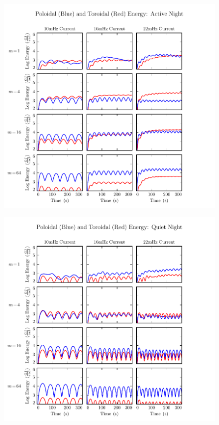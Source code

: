 \begin{figure}[H]
    \centering
    \includegraphics[width=\textwidth]{figures/UP_UT_J_3.pdf}
    \caption[Current-Driven Poloidal and Toroidal Energy: Active Night]{}
    \label{fig_UP_UT_J_3}
\end{figure}

\begin{figure}[H]
    \centering
    \includegraphics[width=\textwidth]{figures/UP_UT_J_4.pdf}
    \caption[Current-Driven Poloidal and Toroidal Energy: Quiet Night]{}
    \label{fig_UP_UT_J_4}
\end{figure}






